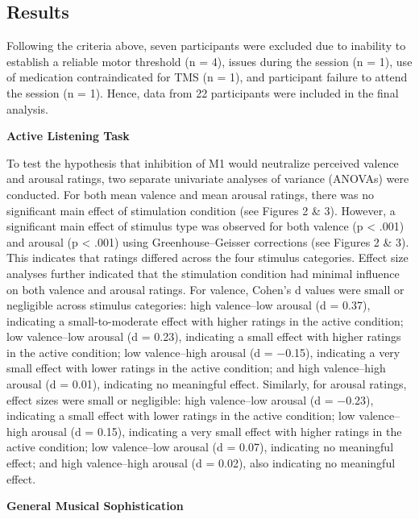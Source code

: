 \documentclass[
]{article}
\begin{document}
\subsection{Results}\label{results}

Following the criteria above, seven participants were excluded due to
inability to establish a reliable motor threshold (n = 4), issues during
the session (n = 1), use of medication contraindicated for TMS (n = 1),
and participant failure to attend the session (n = 1). Hence, data from
22 participants were included in the final analysis.

\textbf{Active Listening Task}

To test the hypothesis that inhibition of M1 would neutralize perceived
valence and arousal ratings, two separate univariate analyses of
variance (ANOVAs) were conducted. For both mean valence and mean arousal
ratings, there was no significant main effect of stimulation condition
(see Figures 2 \& 3). However, a significant main effect of stimulus
type was observed for both valence (p \textless{} .001) and arousal (p
\textless{} .001) using Greenhouse--Geisser corrections (see Figures 2
\& 3). This indicates that ratings differed across the four stimulus
categories. Effect size analyses further indicated that the stimulation
condition had minimal influence on both valence and arousal ratings. For
valence, Cohen's d values were small or negligible across stimulus
categories: high valence--low arousal (d = 0.37), indicating a
small-to-moderate effect with higher ratings in the active condition;
low valence--low arousal (d = 0.23), indicating a small effect with
higher ratings in the active condition; low valence--high arousal (d =
−0.15), indicating a very small effect with lower ratings in the active
condition; and high valence--high arousal (d = 0.01), indicating no
meaningful effect. Similarly, for arousal ratings, effect sizes were
small or negligible: high valence--low arousal (d = −0.23), indicating a
small effect with lower ratings in the active condition; low
valence--high arousal (d = 0.15), indicating a very small effect with
higher ratings in the active condition; low valence--low arousal (d =
0.07), indicating no meaningful effect; and high valence--high arousal
(d = 0.02), also indicating no meaningful effect.

\textbf{General Musical Sophistication}
\end{document}
